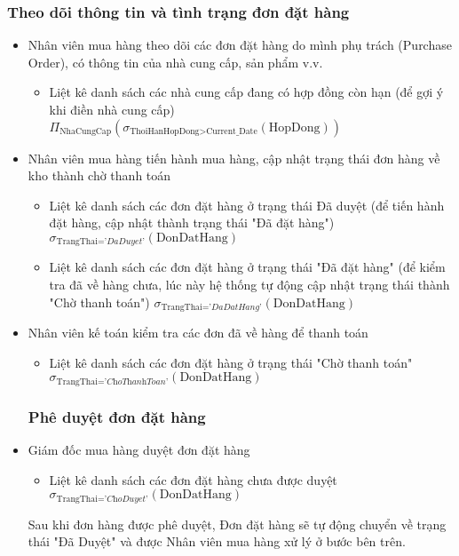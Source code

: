 \documentclass{article}
\begin{document}
	\subsubsection{Theo dõi thông tin và tình trạng đơn đặt hàng}
	\begin{itemize}
		\item Nhân viên mua hàng theo dõi các đơn đặt hàng do mình phụ trách (Purchase
			Order), có thông tin của nhà cung cấp, sản phẩm v.v.
			\begin{itemize}
				\item Liệt kê danh sách các nhà cung cấp đang có hợp đồng còn hạn (để
					gợi ý khi điền nhà cung cấp)\\
					$\Pi_{\text{NhaCungCap}}(\sigma_{\text{ThoiHanHopDong} >
					\text{Current\_Date}}(\text{HopDong}))$
			\end{itemize}

		\item Nhân viên mua hàng tiến hành mua hàng, cập nhật trạng thái đơn hàng về
			kho thành chờ thanh toán
			\begin{itemize}
				\item Liệt kê danh sách các đơn đặt hàng ở trạng thái Đã duyệt (để tiến
					hành đặt hàng, cập nhật thành trạng thái "Đã đặt hàng") \\
					$\sigma_{\text{TrangThai} = \textit{'DaDuyet'}}(\text{DonDatHang})$

				\item Liệt kê danh sách các đơn đặt hàng ở trạng thái "Đã đặt hàng" (để
					kiểm tra đã về hàng chưa, lúc này hệ thống tự động cập nhật trạng thái
					thành "Chờ thanh toán")
					\newline
					$\sigma_{\text{TrangThai} = \textit{'DaDatHang'}}(\text{DonDatHang})$
			\end{itemize}

		\item Nhân viên kế toán kiểm tra các đơn đã về hàng để thanh toán
			\begin{itemize}
				\item Liệt kê danh sách các đơn đặt hàng ở trạng thái "Chờ thanh toán" $\sigma
					_{\text{TrangThai} = \textit{'ChoThanhToan'}}(\text{DonDatHang})$
			\end{itemize}
			\subsubsection{Phê duyệt đơn đặt hàng}

		\item Giám đốc mua hàng duyệt đơn đặt hàng
			\begin{itemize}
				\item Liệt kê danh sách các đơn đặt hàng chưa được duyệt\\
					$\sigma_{\text{TrangThai} = \textit{'ChoDuyet'}}(\text{DonDatHang})$
			\end{itemize}
			Sau khi đơn hàng được phê duyệt, Đơn đặt hàng sẽ tự động chuyển về trạng
			thái "Đã Duyệt" và được Nhân viên mua hàng xử lý ở bước bên trên.
	\end{itemize}
\end{document}
